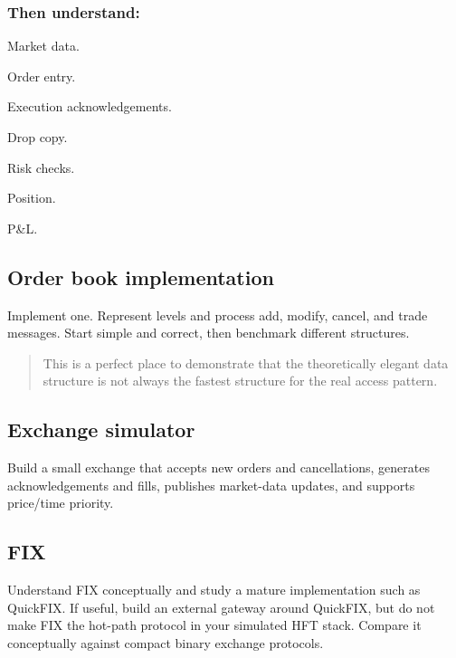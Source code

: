 \documentclass[11pt,letterpaper]{article}
\begin{document}
\subsubsection*{Then understand:}

\begin{topics}

\item Market data.

\item Order entry.

\item Execution acknowledgements.

\item Drop copy.

\item Risk checks.

\item Position.

\item P\&L.

\end{topics}

\subsection*{Order book implementation}

Implement one. Represent levels and process add, modify, cancel, and trade messages. Start simple and correct, then benchmark different structures.

\begin{quote}
This is a perfect place to demonstrate that the theoretically elegant data structure is not always the fastest structure for the real access pattern.
\end{quote}

\subsection*{Exchange simulator}

Build a small exchange that accepts new orders and cancellations, generates acknowledgements and fills, publishes market-data updates, and supports price/time priority.

\subsection*{FIX}

Understand FIX conceptually and study a mature implementation such as QuickFIX. If useful, build an external gateway around QuickFIX, but do not make FIX the hot-path protocol in your simulated HFT stack. Compare it conceptually against compact binary exchange protocols.
\end{document}
